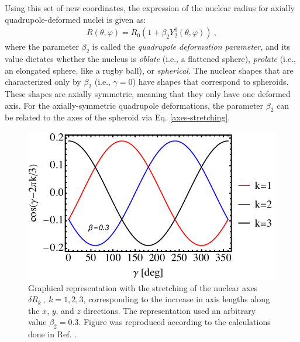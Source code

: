 Using this set of new coordinates, the expression of the nuclear radius for axially quadrupole-deformed nuclei is given as:
\begin{align}
    R(\theta,\varphi)=R_0\left(1+\beta_2 Y_2^0(\theta,\varphi)\right)\ ,
    \label{quadrupole-radius}
\end{align}
where the parameter $\beta_2$ is called the \emph{quadrupole deformation parameter}, and its value dictates whether the nucleus is \emph{oblate} (i.e., a flattened sphere), \emph{prolate} (i.e., an elongated sphere, like a rugby ball), or \emph{spherical}. The nuclear shapes that are characterized only by $\beta_2$ (i.e., $\gamma=0$) have shapes that correspond to spheroids. These shapes are axially symmetric, meaning that they only have one deformed axis. For the axially-symmetric quadrupole deformations, the parameter $\beta_2$ can be related to the axes of the spheroid via Eq. \ref{axes-stretching}.
\begin{figure}
    \centering
    \includegraphics[scale=0.8]{Chapters/Figures/nuclear-radius-elongation.pdf}
    \caption{Graphical representation with the stretching of the nuclear axes $\delta R_k\ ,\ k=1,2,3$, corresponding to the increase in axis lengths along the $x$, $y$, and $z$ directions. The representation used an arbitrary value $\beta_2=0.3$. Figure was reproduced according to the calculations done in Ref. \cite{greiner1996nuclear}.}
    \label{nuclear-radius-elongation}
\end{figure}

